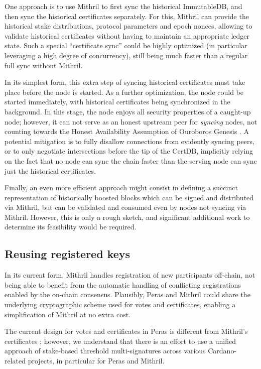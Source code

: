 One approach is to use Mithril to first sync the historical ImmutableDB, and then sync the historical certificates separately.
For this, Mithril can provide the historical stake distributions, protocol parameters and epoch nonces, allowing to validate historical certificates without having to maintain an appropriate ledger state.
Such a special \enquote{certificate sync} could be highly optimized (in particular leveraging a high degree of concurrency), still being much faster than a regular full sync without Mithril.

In its simplest form, this extra step of syncing historical certificates must take place before the node is started.
As a further optimization, the node could be started immediately, with historical certificates being synchronized in the background.
In this stage, the node enjoys all security properties of a caught-up node; however, it can not serve as an honest upstream peer for \emph{syncing} nodes, not counting towards the Honest Availability Assumption of Ouroboros Genesis \parencite{genesis-implementation-documentation}.
A potential mitigation is to fully disallow connections from evidently syncing peers, or to only negotiate intersections before the tip of the CertDB, implicitly relying on the fact that no node can sync the chain faster than the serving node can sync just the historical certificates.

Finally, an even more efficient approach might consist in defining a succinct representation of historically boosted blocks which can be signed and distributed via Mithril, but can be validated and consumed even by nodes not syncing via Mithril.
However, this is only a rough sketch, and significant additional work to determine its feasibility would be required.

\subsection{Reusing registered keys}\label{sec:mithril key reuse}

In its current form, Mithril handles registration of new participants off-chain, not being able to benefit from the automatic handling of conflicting registrations enabled by the on-chain consensus.
Plausibly, Peras and Mithril could share the underlying cryptographic scheme used for votes and certificates, enabling a simplification of Mithril at no extra cost.

The current design for votes and certificates in Peras \parencite{peras-cert-report} is different from Mithril's certificates \parencite{chaidos2024mithril}; however, we understand that there is an effort to use a unified approach of stake-based threshold multi-signatures across various Cardano-related projects, in particular for Peras and Mithril.

